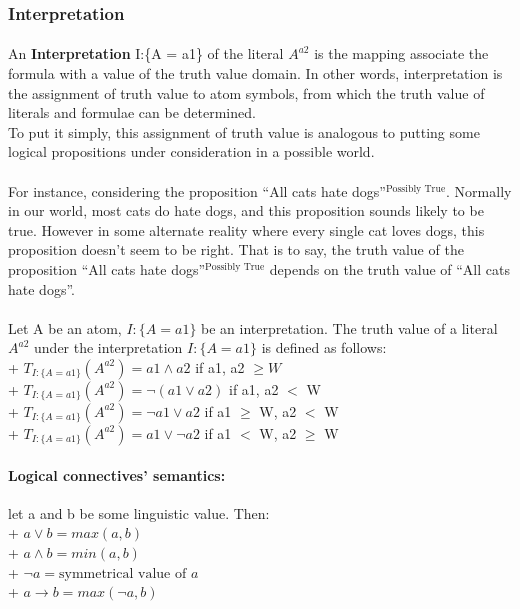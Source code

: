 \documentclass[part1.tex]{subfiles}
\begin{document}
\subsubsection{Interpretation}
\paragraph{} An {\bfseries Interpretation} I:\{A = a1\} of the literal
\(A^{a2}\) is the mapping associate the formula
with a value of the truth value domain. In other words,
interpretation is the assignment of truth value to atom
symbols, from which the truth value of literals and formulae can
be determined.\\
To put it simply, this assignment of truth value is analogous to
putting some logical propositions under consideration in a
possible world.
\paragraph{} For instance, considering the proposition ``All cats
hate dogs''$^{\text{Possibly True}}$. Normally in our world, most
cats do hate dogs, and this proposition sounds likely to be true.
However in some alternate reality where every single cat
loves dogs, this proposition doesn't seem to be right. That is to
say, the truth value of the proposition ``All cats hate dogs''$^{\text{Possibly True}}$
depends on the truth value of ``All cats hate dogs''.

\paragraph{} Let A be an atom, $I:\{A=a1\}$ be an interpretation.
The truth value of a literal $A^{a2}$ under the interpretation
$I:\{A = a1\}$ is defined as follows:\\
\indent + \(T_{I:\{A = a1\}}(A^{a2}) = a1 \wedge a2 \) if a1, a2 \(\ge W\)\\
\indent + \(T_{I:\{A = a1\}}(A^{a2}) = \neg (a1 \vee a2) \) if a1, a2 \(<\) W\\
\indent + \(T_{I:\{A = a1\}}(A^{a2}) = \neg a1 \vee a2 \) if a1 \(\ge\) W, a2 \(<\) W\\
\indent + \(T_{I:\{A = a1\}}(A^{a2}) =  a1 \vee \neg a2 \) if a1 \(<\) W, a2 \(\ge\) W\\

\paragraph{Logical connectives' semantics:} let a and b be some linguistic value. Then:\\
\indent + \(a \vee b = max(a,b)\)\\
\indent + \(a \wedge b = min(a,b)\)\\
\indent + \(\neg a = \text{symmetrical value of } a\)\\
\indent + \(a \to b = max(\neg a,b)\)\\
\end{document}
